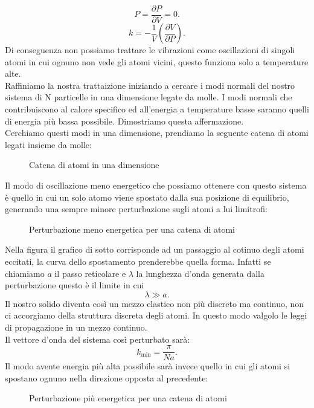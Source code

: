 \[
	P = \frac{\partial P}{\partial V} = 0
.\] 
\[
	k = - \frac{1}{V} \left( \frac{\partial V}{\partial P}  \right) 
.\] 
Di conseguenza non possiamo trattare le vibrazioni come oscillazioni di singoli atomi in cui ognuno non vede gli atomi vicini, questo funziona solo a temperature alte.\\
Raffiniamo la nostra trattaizione iniziando a cercare i modi normali del nostro sistema di N particelle in una dimensione legate da molle. I modi normali che contribuiscono al calore specifico ed all'energia a temperature basse saranno quelli di energia più bassa possibile. Dimostriamo questa affermazione.\\
Cerchiamo questi modi in una dimensione, prendiamo la seguente catena di atomi legati insieme da molle:
\begin{figure}[H]
    \centering
    \caption{Catena di atomi in una dimensione}
    \label{fig:catena-di-atomi-in-una-dimensione}
\end{figure}
\noindent
Il modo di oscillazione meno energetico che possiamo ottenere con questo sistema è quello in cui un solo atomo viene spostato dalla sua posizione di equilibrio, generando una sempre minore perturbazione sugli atomi a lui limitrofi:
\begin{figure}[H]
    \centering
    \caption{Perturbazione meno energetica per una catena di atomi}
    \label{fig:perturbazione-meno-energetica-per-una-catena-di-atomi}
\end{figure}
\noindent
Nella figura il grafico di sotto corrisponde ad un passaggio al cotinuo degli atomi eccitati, la curva dello spostamento prenderebbe quella forma. Infatti se chiamiamo $a$ il passo reticolare e $\lambda $ la lunghezza d'onda generata dalla perturbazione questo è il limite in cui 
\[
	\lambda \gg a
.\] 
Il nostro solido diventa così un mezzo elastico non più discreto ma continuo, non ci accorgiamo della struttura discreta degli atomi. In questo modo valgolo le leggi di propagazione in un mezzo continuo.\\
Il vettore d'onda del sistema così perturbato sarà:
\[
	k_{\text{min}} = \frac{\pi}{Na}
.\] 
Il modo avente energia più alta possibile sarà invece quello in cui gli atomi si spostano ognuno nella direzione opposta al precedente:
\begin{figure}[H]
    \centering
    \caption{Perturbazione più energetica per una catena di atomi}
    \label{fig:perturbazione-più-energetica-per-una-catena-di-atomi}
\end{figure}
